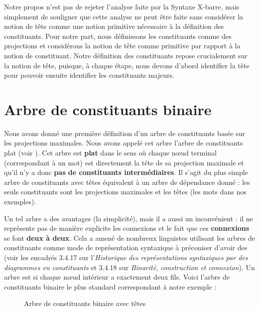 {    Notre propos n’est pas de rejeter l’analyse faite par la Syntaxe X-barre, mais simplement de souligner que cette analyse ne peut être faite sans considérer la notion de tête comme une notion primitive nécessaire à la définition des constituants. Pour notre part, nous définissons les constituants comme des projections et considérons la notion de tête comme primitive par rapport à la notion de constituant. Notre définition des constituants repose crucialement sur la notion de tête, puisque, à chaque étape, nous devons d’abord identifier la tête pour pouvoir ensuite identifier les constituants majeurs.
}
\section{Arbre de constituants binaire}\label{sec:3.4.14}

Nous avons donné une première définition d’un arbre de constituants basée sur les projections maximales. Nous avons appelé cet arbre l’arbre de constituants plat (voir ). Cet arbre est \textbf{plat} dans le sens où chaque nœud terminal (correspondant à un mot) est directement la tête de sa projection maximale et qu’il n’y a donc \textbf{pas de constituants intermédiaires}. Il s’agit du plus simple arbre de constituants avec têtes équivalent à un arbre de dépendance donné : les seuls constituants sont les projections maximales et les têtes (les mots dans nos exemples).

Un tel arbre a des avantages (la simplicité), mais il a aussi un inconvénient : il ne représente pas de manière explicite les connexions et le fait que ces \textbf{connexions} se font \textbf{deux à deux}. Cela a amené de nombreux linguistes utilisant les arbres de constituants comme mode de représentation syntaxique à préconiser d’avoir des  (voir les encadrés 3.4.17 sur l’\textit{Historique des représentations syntaxiques par des diagrammes en constituants} et 3.4.18 sur \textit{Binarité, construction et connexion}). Un arbre est  si chaque nœud intérieur a exactement deux fils. Voici l’arbre de constituants binaire le plus standard correspondant à notre exemple :

\begin{figure}

\caption{\label{fig:}Arbre de constituants binaire avec têtes}

\end{figure}

